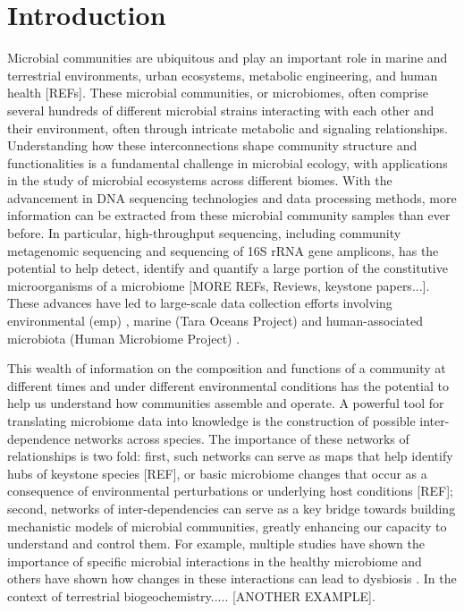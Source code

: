 
\section*{Introduction}

  Microbial communities are ubiquitous and play an important role in marine and terrestrial environments, urban ecosystems, metabolic engineering, and human health [REFs].
  These microbial communities, or microbiomes, often comprise several hundreds of different microbial strains interacting with each other and their environment, often through intricate metabolic and signaling relationships.
  Understanding how these interconnections shape community structure and functionalities is a fundamental challenge in microbial ecology, with applications in the study of microbial ecosystems across different biomes. 
  With the advancement in DNA sequencing technologies \cite{Narihiro2017} and data processing methods,  more information can be extracted from these microbial community samples than ever before.
  In particular, high-throughput sequencing, including community metagenomic sequencing and sequencing of 16S rRNA gene amplicons, has the potential to help detect, identify and quantify a large portion of the constitutive microorganisms of a microbiome \cite{Jovel2016} [MORE REFs, Reviews, keystone papers...].
  These advances have led to large-scale data collection efforts involving environmental (\acl{emp}) \cite{Thompson2017}, marine (Tara Oceans Project) \cite{Zhang2015} and human-associated microbiota (Human Microbiome Project) \cite{HumanMicrobiomeProjectConsortium2012}.

 This wealth of information on the composition and functions of a community at different times and under different environmental conditions has the potential to help us understand how communities assemble and operate.
 A powerful tool for translating microbiome data into knowledge is the construction of possible inter-dependence networks across species.
 The importance of these networks of relationships is two fold: first, such networks can serve as maps that help identify hubs of keystone species [REF], or basic microbiome changes that occur as a consequence of environmental perturbations or underlying host conditions [REF]; second, networks of inter-dependencies can serve as a key bridge towards building mechanistic models of microbial communities, greatly enhancing our capacity to understand and control them.
 For example, multiple studies have shown the importance of specific microbial interactions in the healthy microbiome \cite{Lloyd-Price2016} and others have shown how changes in these interactions can lead to dysbiosis \cite{Wang2017,Gilbert2016,Belizario2015}.
 In the context of terrestrial biogeochemistry..... [ANOTHER EXAMPLE].

